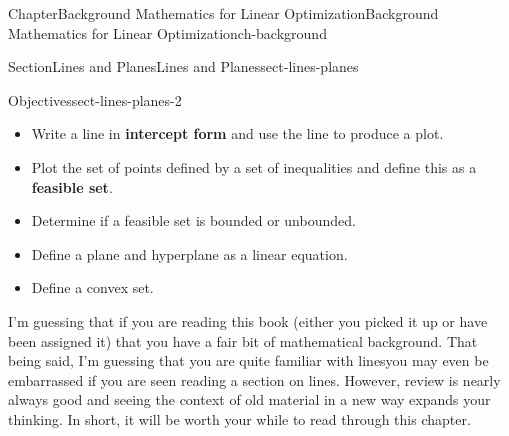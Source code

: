 \documentclass[oneside,10pt,]{book}
\newcommand{\terminology}[1]{\textbf{#1}}
\numberwithin{equation}{section}
\begin{document}
\setcounter{tocdepth}{1}
\renewcommand*\contentsname{Contents}
\tableofcontents
\mainmatter
%
%
\typeout{************************************************}
\typeout{************************************************}
%
\begin{chapterptx}{Chapter}{Background Mathematics for Linear Optimization}{}{Background Mathematics for Linear Optimization}{}{}{ch-background}
\renewcommand*{\chaptername}{Chapter}
\begin{introduction}{}%
%
\end{introduction}%
%
%
\typeout{************************************************}
\typeout{************************************************}
%
\begin{sectionptx}{Section}{Lines and Planes}{}{Lines and Planes}{}{}{sect-lines-planes}
\begin{objectives}{Objectives}{sect-lines-planes-2}
%
\begin{itemize}[label=\textbullet]
\item{}Write a line in \terminology{intercept form} and use the line to produce a plot.%
\item{}Plot the set of points defined by a set of inequalities and define this as a \terminology{feasible set}.%
\item{}Determine if a feasible set is bounded or unbounded.%
\item{}Define a plane and hyperplane as a linear equation.%
\item{}Define a convex set.%
\end{itemize}
\end{objectives}
\begin{introduction}{}%
I'm guessing that if you are reading this book (either you picked it up or have been assigned it) that you have a fair bit of mathematical background. That being said, I'm guessing that you are quite familiar with lines\textemdash{}you may even be embarrassed if you are seen reading a section on lines. However, review is nearly always good and seeing the context of old material in a new way expands your thinking. In short, it will be worth your while to read through this chapter.%
\end{introduction}%
%
%
\typeout{************************************************}
\typeout{************************************************}

\end{sectionptx}
\end{chapterptx}
\end{document}

